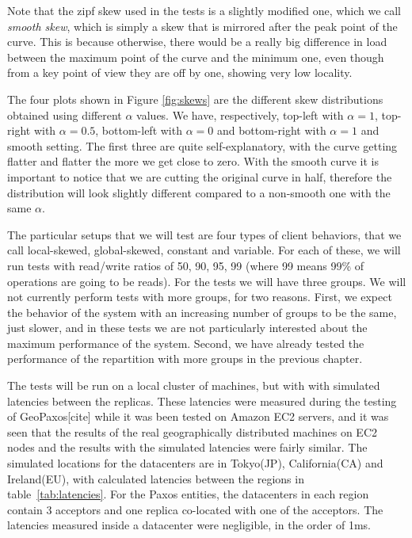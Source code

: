 Note that the zipf skew used in the tests is a slightly modified one, which we call \emph{smooth skew}, which is simply a skew that is mirrored after the peak point of the curve. This is because otherwise, there would be a really big difference in load between the maximum point of the curve and the minimum one, even though from a key point of view they are off by one, showing very low locality.

The four plots shown in Figure \ref{fig:skews} are the different skew distributions obtained using different $\alpha$ values. We have, respectively, top-left with $\alpha = 1$, top-right with $\alpha = 0.5$, bottom-left with $\alpha = 0$ and bottom-right with $\alpha = 1$ and smooth setting. The first three are quite self-explanatory, with the curve getting flatter and flatter the more we get close to zero. With the smooth curve it is important to notice that we are cutting the original curve in half, therefore the distribution will look slightly different compared to a non-smooth one with the same $\alpha$.

The particular setups that we will test are four types of client behaviors, that we call local-skewed, global-skewed, constant and variable. For each of these, we will run tests with read/write ratios of 50, 90, 95, 99 (where 99 means 99\% of operations are going to be reads). For the tests we will have three groups. We will not currently perform tests with more groups, for two reasons. First, we expect the behavior of the system with an increasing number of groups to be the same, just slower, and in these tests we are not particularly interested about the maximum performance of the system. Second, we have already tested the performance of the repartition with more groups in the previous chapter.

The tests will be run on a local cluster of machines, but with with simulated latencies between the replicas. These latencies were measured during the testing of GeoPaxos[cite] while it was been tested on Amazon EC2 servers, and it was seen that the results of the real geographically distributed machines on EC2 nodes and the results with the simulated latencies were fairly similar. The simulated locations for the datacenters are in Tokyo(JP), California(CA) and Ireland(EU), with calculated latencies between the regions in table~\ref{tab:latencies}. For the Paxos entities, the datacenters in each region contain 3 acceptors and one replica co-located with one of the acceptors. The latencies measured inside a datacenter were negligible, in the order of 1ms.


